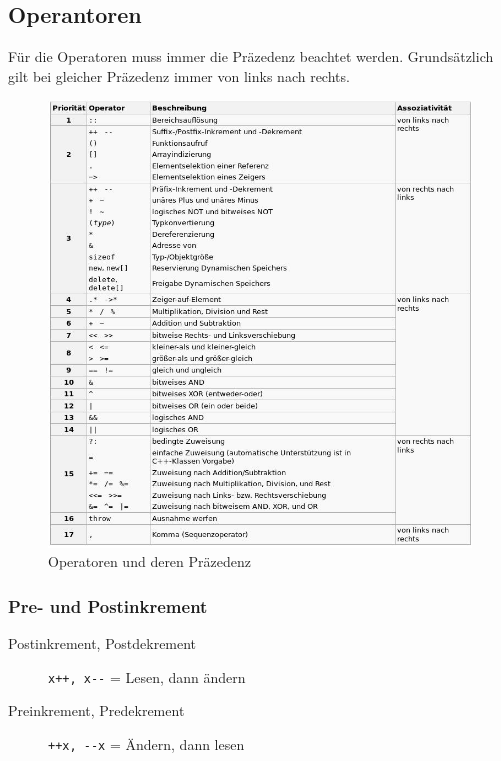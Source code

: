 \subsection{Operantoren}
Für die Operatoren muss immer die Präzedenz beachtet werden. Grundsätzlich gilt bei gleicher Präzedenz immer von links nach rechts.
\begin{figure}[h]
\centering
\includegraphics[width=0.9\linewidth]{images/operator}
\caption{Operatoren und deren Präzedenz}
\label{fig:operator}
\end{figure}

\subsubsection{Pre- und Postinkrement}
\begin{description}
	\item[Postinkrement, Postdekrement] \lstinline|x++, x--| = Lesen, dann ändern
	\item[Preinkrement, Predekrement] \lstinline|++x, --x| = Ändern, dann lesen
\end{description}

